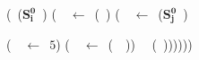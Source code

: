 \newcommand{\makeNT}[2]{\mbox{$\mathbf{S_{#2}^{#1}}$}}
    \begin{minipage}{.50\textwidth}
        \small
        \renewcommand{\arraystretch}{1}{
          \begin{uprogram}
            \UFL (\DEFINE\ (\makeNT{0}{i}~\pa)
             (\LET\ \pb\ $\leftarrow $\
(\CAR~\pa) \IN
             (\LET\ \pc\ $\leftarrow $\
(\makeNT{0}{j}~\pb) \IN
            
             (\LET\ \pd\ $\leftarrow$\ $5$) \IN
             (\LET\ \pe\ $\leftarrow$\ (\CONS\ \pc\ \pd)) \IN\ \ (\SRETURN~\ret))))))
        \end{uprogram}}
\end{minipage}
